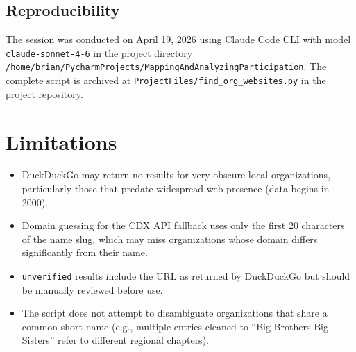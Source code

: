 \documentclass[12pt]{article}
\begin{document}
\subsection{Reproducibility}

The session was conducted on April 19, 2026 using Claude Code CLI with
model \texttt{claude-sonnet-4-6} in the project directory
\texttt{/home/brian/PycharmProjects/MappingAndAnalyzingParticipation}.
The complete script is archived at
\texttt{ProjectFiles/find\_org\_websites.py} in the project repository.

\section{Limitations}

\begin{itemize}
  \item DuckDuckGo may return no results for very obscure local organizations,
        particularly those that predate widespread web presence (data begins in 2000).
  \item Domain guessing for the CDX API fallback uses only the first 20
        characters of the name slug, which may miss organizations whose domain
        differs significantly from their name.
  \item \texttt{unverified} results include the URL as returned by DuckDuckGo
        but should be manually reviewed before use.
  \item The script does not attempt to disambiguate organizations that share
        a common short name (e.g., multiple entries cleaned to
        ``Big Brothers Big Sisters'' refer to different regional chapters).
\end{itemize}
\end{document}
